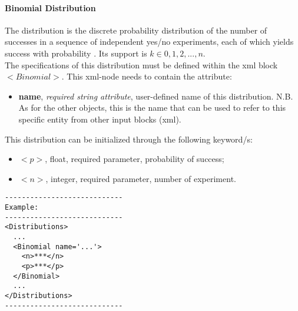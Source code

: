\paragraph{Binomial Distribution}
\label{Binomial}
The  distribution is the discrete probability distribution of the number of successes in a sequence of  independent yes/no experiments, each of which yields success with probability . Its support is $k \in {0, 1, 2, ..., n}$.
\\ The specifications of this distribution must be defined within the xml block $<Binomial>$. This xml-node needs to contain the attribute:
\vspace{-5mm}
\begin{itemize}
\itemsep0em
\item \textbf{name}, \textit{required string attribute}, user-defined name of this distribution. N.B. As for the other objects, this is the name that can be used to refer to this specific entity from other input blocks (xml).   
\end{itemize}
\vspace{-5mm}
This distribution can be initialized through the following keyword/s:
\begin{itemize}
\item $<p>$, float, required parameter,  probability of success;
\item $<n>$, integer, required parameter, number of experiment.
\end{itemize}

\begin{lstlisting}[style=XML]
----------------------------
Example:
----------------------------
<Distributions>
  ...
  <Binomial name='...'>
    <n>***</n>
    <p>***</p>
  </Binomial>
  ...
</Distributions>
----------------------------
\end{lstlisting}

